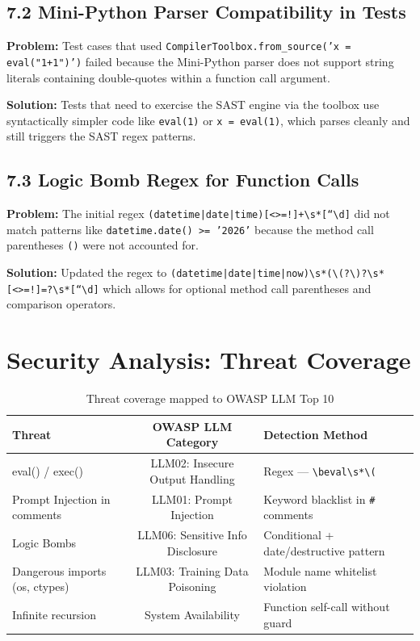 \documentclass[a4paper,11pt]{article}
\begin{document}
\subsection{7.2 Mini-Python Parser Compatibility in Tests}

\textbf{Problem:} Test cases that used \texttt{CompilerToolbox.from\_source('x = eval("1+1")')} failed because the Mini-Python parser does not support string literals containing double-quotes within a function call argument.

\textbf{Solution:} Tests that need to exercise the SAST engine via the toolbox use syntactically simpler code like \texttt{eval(1)} or \texttt{x = eval(1)}, which parses cleanly and still triggers the SAST regex patterns.

\subsection{7.3 Logic Bomb Regex for Function Calls}

\textbf{Problem:} The initial regex \texttt{(datetime|date|time)[\textless\textgreater=!]+\textbackslash s*[\textquotesingle ``\textbackslash d]} did not match patterns like \texttt{datetime.date() >= '2026'} because the method call parentheses \texttt{()} were not accounted for.

\textbf{Solution:} Updated the regex to \texttt{(datetime|date|time|now)\textbackslash s*(\textbackslash (?\textbackslash )?\textbackslash s*[\textless\textgreater=!]=?\textbackslash s*[\textquotesingle ``\textbackslash d]} which allows for optional method call parentheses and comparison operators.

\section{Security Analysis: Threat Coverage}

\begin{table}[h]
\centering
\begin{tabularx}{\textwidth}{|l|c|X|}
\hline
\rowcolor{red!10}
\textbf{Threat} & \textbf{OWASP LLM Category} & \textbf{Detection Method} \\
\hline
eval() / exec() & LLM02: Insecure Output Handling & Regex — \texttt{\textbackslash beval\textbackslash s*\textbackslash (} \\
\hline
Prompt Injection in comments & LLM01: Prompt Injection & Keyword blacklist in \texttt{\#} comments \\
\hline
Logic Bombs & LLM06: Sensitive Info Disclosure & Conditional + date/destructive pattern \\
\hline
Dangerous imports (os, ctypes) & LLM03: Training Data Poisoning & Module name whitelist violation \\
\hline
Infinite recursion & System Availability & Function self-call without guard \\
\hline
\end{tabularx}
\caption{Threat coverage mapped to OWASP LLM Top 10}
\end{table}
\end{document}
